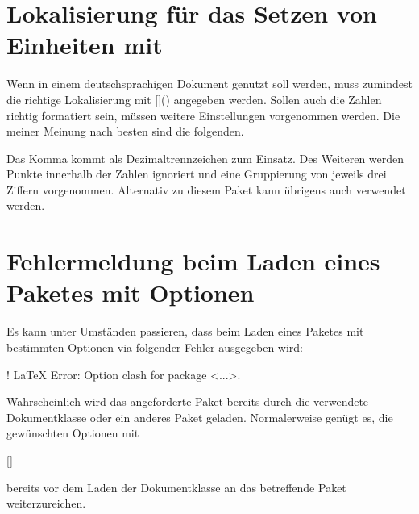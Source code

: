 \section{%
  Lokalisierung für das Setzen von Einheiten mit %
}
%
%
%
Wenn  in einem deutschsprachigen Dokument genutzt soll
werden, muss zumindest die richtige Lokalisierung mit
[]() angegeben werden. 
Sollen auch die Zahlen richtig formatiert sein, müssen weitere Einstellungen 
vorgenommen werden. Die meiner Meinung nach besten sind die folgenden.
%
\begin{quoting}
\begin{Code}
\end{Code}
\end{quoting}
%
Das Komma kommt als Dezimaltrennzeichen zum Einsatz. Des Weiteren werden Punkte 
innerhalb der Zahlen ignoriert und eine Gruppierung von jeweils drei Ziffern 
vorgenommen. Alternativ zu diesem Paket kann übrigens auch  
verwendet werden.



\section{Fehlermeldung beim Laden eines Paketes mit Optionen}
%
Es kann unter Umständen passieren, dass beim Laden eines Paketes mit bestimmten 
Optionen via  folgender Fehler ausgegeben wird:
%
\begin{quoting}
\begin{Code}[escapechar=§]
! LaTeX Error: Option clash for package <...>.
\end{Code}
\end{quoting}
%
Wahrscheinlich wird das angeforderte Paket bereits durch die verwendete 
Dokumentklasse oder ein anderes Paket geladen. Normalerweise genügt es, die 
gewünschten Optionen mit
\begin{quoting}
\begin{Entity}{}
\newline%
[]%
\end{Entity}
\end{quoting}
bereits vor dem Laden der Dokumentklasse an das betreffende Paket 
weiterzureichen.



